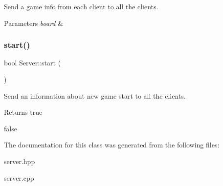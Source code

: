 Send a game info from each client to all the clients. 


\begin{DoxyParams}{Parameters}
{\em board} & \\
\hline
\end{DoxyParams}
\mbox{\label{classServer_acec935535d1d5b58d95cf24678eac014}} 
\subsubsection{\texorpdfstring{start()}{start()}}
{\footnotesize\ttfamily bool Server\+::start (\begin{DoxyParamCaption}{ }\end{DoxyParamCaption})}



Send an information about new game start to all the clients. 

\begin{DoxyReturn}{Returns}
true 

false 
\end{DoxyReturn}


The documentation for this class was generated from the following files\+:\begin{DoxyCompactItemize}
\item 
server.\+hpp\item 
server.\+cpp\end{DoxyCompactItemize}
